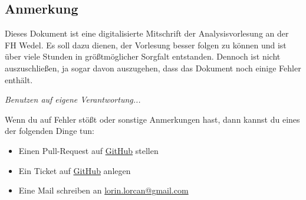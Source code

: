 \subsection*{Anmerkung}

Dieses Dokument ist eine digitalisierte Mitschrift der Analysisvorlesung an der FH Wedel. Es soll dazu dienen, der Vorlesung besser folgen zu können und ist über viele Stunden in größtmöglicher Sorgfalt entstanden. Dennoch ist nicht auszuschließen, ja sogar davon auszugehen, dass das Dokument noch einige Fehler enthält.

\bigskip
\textit{Benutzen auf eigene Verantwortung...}
\bigskip

Wenn du auf Fehler stößt oder sonstige Anmerkungen hast, dann kannst du eines der folgenden Dinge tun:
\begin{itemize}
    \item Einen Pull-Request auf \href{\reposityurl/pulls}{GitHub} stellen
    \item Ein Ticket auf \href{\reposityurl/issues}{GitHub} anlegen
    \item Eine Mail schreiben an \href{mailto:lorin.lorcan@gmail.com}{lorin.lorcan@gmail.com}
\end{itemize}
